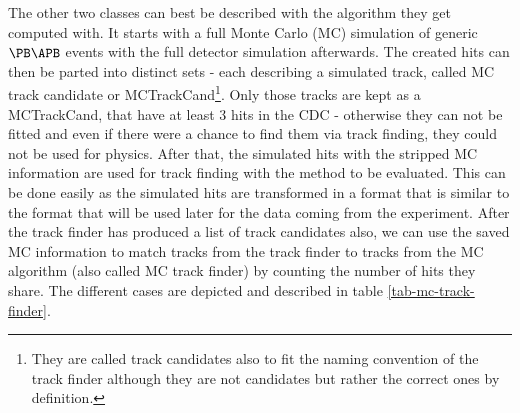 The other two classes can best be described with the algorithm they get computed with. It starts with a full Monte Carlo (MC) simulation of generic $\PB\APB$ events with the full detector simulation afterwards. The created hits can then be parted into distinct sets - each describing a simulated track, called MC track candidate or MCTrackCand\footnote{They are called track candidates also to fit the naming convention of the track finder although they are not candidates but rather the correct ones by definition.}. Only those tracks are kept as a MCTrackCand, that have at least 3 hits in the CDC - otherwise they can not be fitted and even if there were a chance to find them via track finding, they could not be used for physics. After that, the simulated hits with the stripped MC information are used for track finding with the method to be evaluated. This can be done easily as the simulated hits are transformed in a format that is similar to the format that will be used later for the data coming from the experiment. After the track finder has produced a list of track candidates also, we can use the saved MC information to match tracks from the track finder to tracks from the MC algorithm (also called MC track finder) by counting the number of hits they share. The different cases are depicted and described in table \ref{tab-mc-track-finder}.

